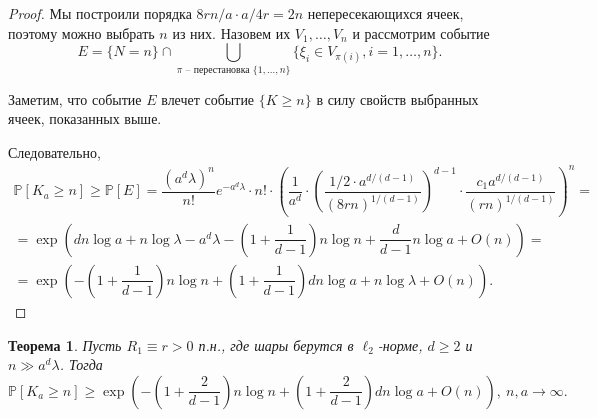 \documentclass[12pt]{article}
\theoremstyle{plain}
\newtheorem{thm}{Теорема} %
\theoremstyle{definition}
\theoremstyle{remark}
\def\geq{\geqslant}
\newcommand{\PP}{\mathbb{P}}
\begin{document}
\begin{proof}
    
    Мы построили порядка $8rn/a \cdot a/4r = 2n$ непересекающихся ячеек, поэтому можно выбрать $n$ из них. Назовем их $V_1, \ldots, V_n$  и рассмотрим событие $$E = \{N=n\}\cap \bigcup\limits_{\pi \text{ -- перестановка } \{1, \ldots, n\}} \{\xi_i \in V_{\pi(i)}, i = 1, \ldots, n\}.$$
                         
    Заметим, что событие $E$ влечет событие $\{K \geq n\}$ в силу свойств выбранных ячеек, показанных выше.
  
    Следовательно, 
    \begin{multline*}
        \PP[K_a\geq n] \geq \PP[E] = \dfrac{(a^d\lambda)^n}{n!}e^{-a^d\lambda}\cdot n!\cdot \left(\dfrac{1}{a^d}\cdot\left(\dfrac{1/2\cdot a^{d/(d-1)}}{(8rn)^{1/(d-1)}}\right)^{d-1}\cdot \dfrac{c_1a^{d/(d-1)}}{(rn)^{1/(d-1)}}\right)^n = \\
        =\exp\left(dn\log a + n\log\lambda - a^d\lambda - \left(1+\dfrac{1}{d-1}\right)n\log n + \dfrac{d}{d-1} n\log a  + O(n)\right) =\\
        =\exp\left(-\left(1 + \dfrac{1}{d-1}\right)n\log n + \left(1 + \dfrac{1}{d-1}\right)dn\log a + n\log\lambda + O(n)\right).
    \end{multline*}{}
\end{proof}{}

\begin{thm}
Пусть $R_1\equiv r > 0$ п.н., где шары берутся в $\ell_2$-норме, $d\geq 2$ и $n \gg a^d\lambda$. 
Тогда $$\PP[K_a \geq n] \geq \exp \left(-\left(1+\dfrac{2}{d-1}\right)n\log n + \left(1+\dfrac{2}{d-1}\right)dn\log a  + O(n)\right),\  n, a\to \infty.$$
\end{thm}{}
\end{document}
